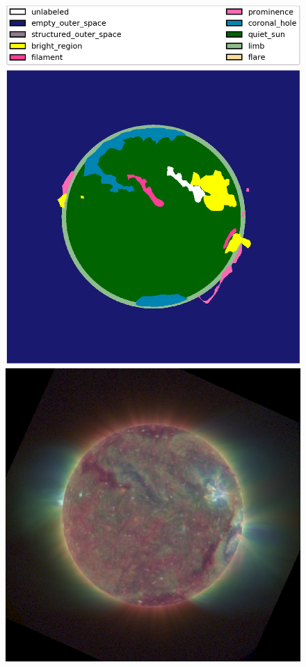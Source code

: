 \documentclass[twoside]{report}
\begin{document}
\begin{figure}[ht]
  \begin{center}
    \includegraphics[scale=0.1]{g20171102000206-0}
    \includegraphics[scale=0.35]{g20171102000206}

\end{center}
\end{figure}
\end{document}
